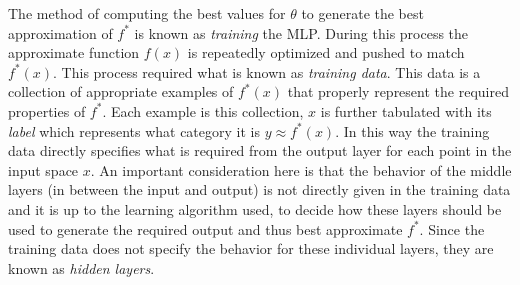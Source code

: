 \documentclass[14pt]{extarticle}
\numberwithin{equation}{section}
\begin{document}
	The method of computing the best values for $\theta$ to generate the best approximation of $f^*$ is known as \textit{training} the MLP. During this process the approximate function $f(x)$ is repeatedly optimized and pushed to match $f^*(x)$. This process required what is known as \textit{training data}. This data is a collection of appropriate examples of $f^*(x)$ that properly represent the required properties of $f^*$. Each example is this collection, $x$ is further tabulated with its \textit{label} which represents what category it is $y \approx f^*(x)$. In this way the training data directly specifies what is required from the output layer for each point in the input space $x$. An important consideration here is that the behavior of the middle layers (in between the input and output) is not directly given in the training data and it is up to the learning algorithm used, to decide how these layers should be used to generate the required output and thus best approximate $f^*$. Since the training data does not specify the behavior for these individual layers, they are known as \textit{hidden layers}.
	
\end{document}
